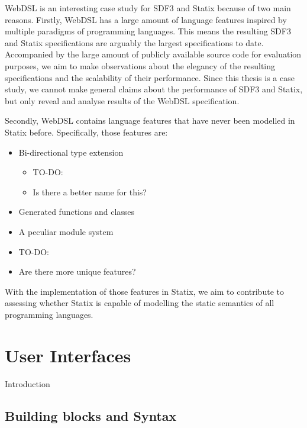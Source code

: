   WebDSL is an interesting case study for SDF3 and Statix because of two main reasons. Firstly, WebDSL has a large amount of language features inspired by multiple paradigms of programming languages. This means the resulting SDF3 and Statix specifications are arguably the largest specifications to date. Accompanied by the large amount of publicly available source code for evaluation purposes, we aim to make observations about the elegancy of the resulting specifications and the scalability of their performance. Since this thesis is a case study, we cannot make general claims about the performance of SDF3 and Statix, but only reveal and analyse results of the WebDSL specification.

  Secondly, WebDSL contains language features that have never been modelled in Statix before. Specifically, those features are:

  \begin{itemize}
    \item Bi-directional type extension
    \begin{itemize}
      \item TO-DO:
      \item Is there a better name for this?
    \end{itemize}
    \item Generated functions and classes
    \item A peculiar module system
    \item TO-DO:
    \item Are there more unique features?
  \end{itemize}

  With the implementation of those features in Statix, we aim to contribute to assessing whether Statix is capable of modelling the static semantics of all programming languages.

  \section{\label{sec:ui}User Interfaces}

    Introduction

    \subsection{\label{subsec:building-blocks}Building blocks and Syntax}

